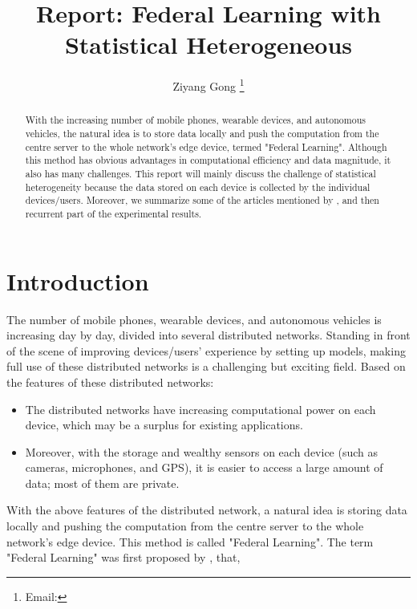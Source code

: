 \documentclass[a4paper,12pt,authoryear]{elegantpaper}
\title{Report: Federal Learning with Statistical Heterogeneous}
\author{Ziyang Gong \thanks{Email: \email{meetziyang@outlook.com}}}
\institute{School of Statistics, Southwest University of Finance and Economics}
\date{}
\begin{document}
\maketitle

\begin{abstract}
    With the increasing number of mobile phones, wearable devices, and autonomous vehicles, the natural idea is to store data locally and push the computation from the centre server to the whole network's edge device, termed "Federal Learning". Although this method has obvious advantages in computational efficiency and data magnitude, it also has many challenges. This report will mainly discuss the challenge of statistical heterogeneity because the data stored on each device is collected by the individual devices/users. Moreover, we summarize some of the articles mentioned by \cite{li_federated_2020}, and then recurrent part of the experimental results.
\end{abstract}

\section{Introduction}

The number of mobile phones, wearable devices, and autonomous vehicles is increasing day by day, divided into several distributed networks. Standing in front of the scene of improving devices/users' experience by setting up models, making full use of these distributed networks is a challenging but exciting field. Based on the features of these distributed networks:

\begin{itemize}
    \item The distributed networks have increasing computational power on each device, which may be a surplus for existing applications.
    \item Moreover, with the storage and wealthy sensors on each device (such as cameras, microphones, and GPS), it is easier to access a large amount of data; most of them are private.
\end{itemize}

With the above features of the distributed network, a natural idea is storing data locally and pushing the computation from the centre server to the whole network's edge device. This method is called "Federal Learning". The term "Federal Learning" was first proposed by \cite{mcmahan_communication-efficient_2017}, that,
\end{document}
